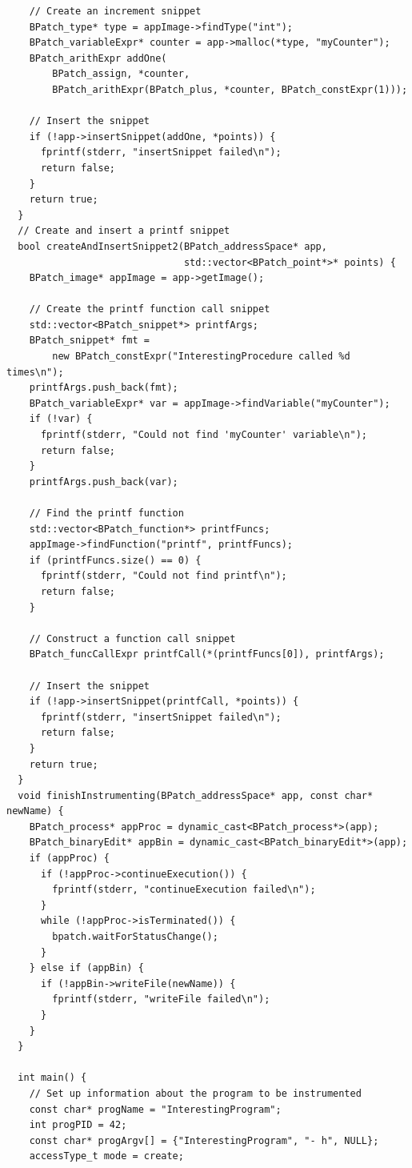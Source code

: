 \begin{lstlisting}
    // Create an increment snippet
    BPatch_type* type = appImage->findType("int");
    BPatch_variableExpr* counter = app->malloc(*type, "myCounter");
    BPatch_arithExpr addOne(
        BPatch_assign, *counter,
        BPatch_arithExpr(BPatch_plus, *counter, BPatch_constExpr(1)));

    // Insert the snippet
    if (!app->insertSnippet(addOne, *points)) {
      fprintf(stderr, "insertSnippet failed\n");
      return false;
    }
    return true;
  }
  // Create and insert a printf snippet
  bool createAndInsertSnippet2(BPatch_addressSpace* app,
                               std::vector<BPatch_point*>* points) {
    BPatch_image* appImage = app->getImage();

    // Create the printf function call snippet
    std::vector<BPatch_snippet*> printfArgs;
    BPatch_snippet* fmt =
        new BPatch_constExpr("InterestingProcedure called %d times\n");
    printfArgs.push_back(fmt);
    BPatch_variableExpr* var = appImage->findVariable("myCounter");
    if (!var) {
      fprintf(stderr, "Could not find 'myCounter' variable\n");
      return false;
    }
    printfArgs.push_back(var);

    // Find the printf function
    std::vector<BPatch_function*> printfFuncs;
    appImage->findFunction("printf", printfFuncs);
    if (printfFuncs.size() == 0) {
      fprintf(stderr, "Could not find printf\n");
      return false;
    }

    // Construct a function call snippet
    BPatch_funcCallExpr printfCall(*(printfFuncs[0]), printfArgs);

    // Insert the snippet
    if (!app->insertSnippet(printfCall, *points)) {
      fprintf(stderr, "insertSnippet failed\n");
      return false;
    }
    return true;
  }
  void finishInstrumenting(BPatch_addressSpace* app, const char* newName) {
    BPatch_process* appProc = dynamic_cast<BPatch_process*>(app);
    BPatch_binaryEdit* appBin = dynamic_cast<BPatch_binaryEdit*>(app);
    if (appProc) {
      if (!appProc->continueExecution()) {
        fprintf(stderr, "continueExecution failed\n");
      }
      while (!appProc->isTerminated()) {
        bpatch.waitForStatusChange();
      }
    } else if (appBin) {
      if (!appBin->writeFile(newName)) {
        fprintf(stderr, "writeFile failed\n");
      }
    }
  }

  int main() {
    // Set up information about the program to be instrumented
    const char* progName = "InterestingProgram";
    int progPID = 42;
    const char* progArgv[] = {"InterestingProgram", "- h", NULL};
    accessType_t mode = create;


\end{lstlisting}
